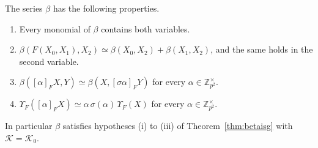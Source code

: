 \begin{theorem}\label{betaprops}
The series $\beta$ has the following properties.
\begin{enumerate}
\item[(i)] Every monomial of $\beta$ contains both variables.
\item[(ii)] $\beta(F(X_0,X_1),X_2)\simeq\beta(X_0,X_2)+\beta(X_1,X_2)$, and the same holds in the second variable.
\item[(iii)] $\beta([\alpha]_FX,Y)\simeq\beta(X,[\sigma\alpha]_FY)$ for every $\alpha\in\mathbb Z_{p^2}^\times$.
\item[(iv)] $\Upsilon_F([\alpha]_FX)\simeq\alpha\,\sigma(\alpha)\,\Upsilon_F(X)$ for every $\alpha\in\mathbb Z_{p^2}^\times$.
\end{enumerate}
In particular $\beta$ satisfies hypotheses (i) to (iii) of Theorem~\ref{thm:betaisg} with $\mathcal K=\mathcal K_0$.
\end{theorem}

